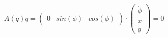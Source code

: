 \documentclass[preview]{standalone}
\begin{document}
\begin{center}
$A(q)\dot{q} = \begin{pmatrix}0 & sin(\phi) & cos(\phi)\end{pmatrix} \cdot \begin{pmatrix}\dot{\phi}\\\dot{x}\\\dot{y} \end{pmatrix} = 0$
\end{center}
\end{document}
